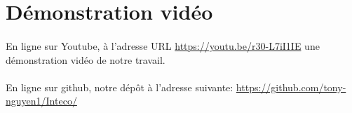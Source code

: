 \documentclass[a4paper]{article}
\begin{document}
        \section*{Démonstration vidéo}
            \paragraph{}
                En ligne sur Youtube, à l'adresse URL \url{https://youtu.be/r30-L7iI1IE} une démonstration vidéo de notre travail.
            \paragraph{}
                En ligne sur github, notre dépôt à l'adresse suivante: \url{https://github.com/tony-nguyen1/Inteco/}
\end{document}
